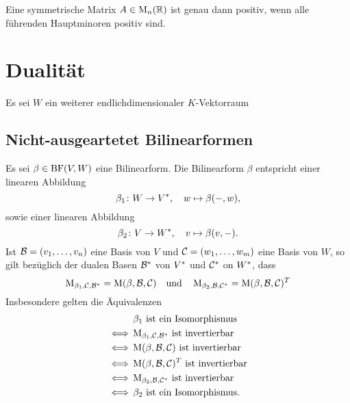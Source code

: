 \begin{lemma}[Hauptminorenkriterium]
  Eine symmetrische Matrix $A \in \operatorname{M}_{n}(\mathbb{R})$ ist genau dann positiv, wenn alle führenden Hauptminoren positiv sind.
\end{lemma}





\section{Dualität}

Es sei $W$ ein weiterer endlichdimensionaler $K$-Vektorraum



\subsection{Nicht-ausgeartetet Bilinearformen}

Es sei $\beta \in \operatorname{BF}(V, W)$ eine Bilinearform.
Die Bilinearform $\beta$ entspricht einer linearen Abbildung
\[
          \beta_1
  \colon  W
  \to     V^*,
  \quad
          w
  \mapsto \beta(-,w),
\]
sowie einer linearen Abbildung
\[
          \beta_2
  \colon  V
  \to     W^*,
  \quad
          v
  \mapsto \beta(v,-).
\]
Ist $\mathcal{B} = (v_1, \dotsc, v_n)$ eine Basis von $V$ und $\mathcal{C} = (w_1, \dotsc, w_m)$ eine Basis von $W$, so gilt bezüglich der dualen Basen $\mathcal{B}^*$ von $V^*$ und $\mathcal{C}^*$ on $W^*$, dass
\[
    \operatorname{M}_{\beta_1, \mathcal{C}, \mathcal{B}^*}
  = \operatorname{M}(\beta, \mathcal{B}, \mathcal{C})
  \quad\text{und}\quad
    \operatorname{M}_{\beta_2, \mathcal{B}, \mathcal{C}^*}
  = \operatorname{M}(\beta, \mathcal{B}, \mathcal{C}) ^T
\]
Insbesondere gelten die Äquivalenzen
\begin{align*}
      &\, \text{$\beta_1$ ist ein Isomorphismus}                                                  \\
  \iff&\, \text{$\operatorname{M}_{\beta_1, \mathcal{C}, \mathcal{B}^*}$ ist invertierbar}           \\
  \iff&\, \text{$\operatorname{M}(\beta, \mathcal{B}, \mathcal{C})$ ist invertierbar}                \\
  \iff&\, \text{$\operatorname{M}(\beta, \mathcal{B}, \mathcal{C}) ^T$ ist invertierbar}  \\
  \iff&\, \text{$\operatorname{M}_{\beta_2, \mathcal{B}, \mathcal{C}^*}$ ist invertierbar}           \\
  \iff&\, \text{$\beta_2$ ist ein Isomorphismus}.
\end{align*}

